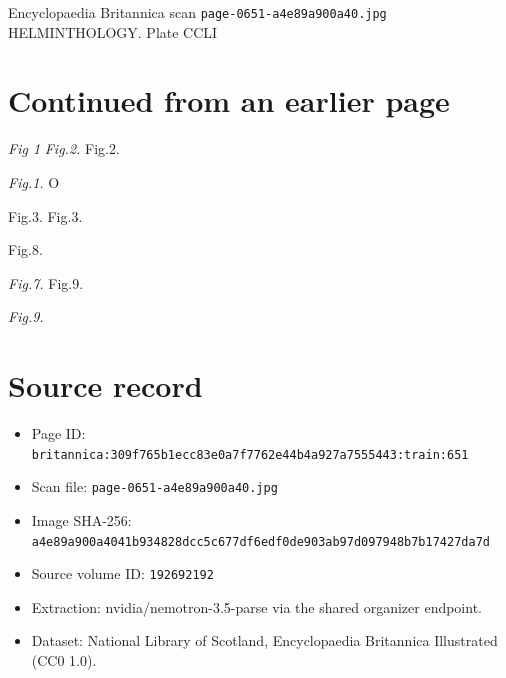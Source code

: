 \documentclass{article}
\begin{document}
\begin{center}
{\Large Encyclopaedia Britannica scan \texttt{page-0651-a4e89a900a40.jpg}}\\[0.5em]
HELMINTHOLOGY. Plate CCLI
\end{center}
\section*{Continued from an earlier page}
\textit{Fig 1}
\textit{Fig.2.}
Fig.2.

\textit{Fig.1.}
O

Fig.3. Fig.3.

Fig.8.

\textit{Fig.7.}
Fig.9.

\textit{Fig.9.}
\section*{Source record}
\begin{itemize}
\item Page ID: \texttt{britannica:309f765b1ecc83e0a7f7762e44b4a927a7555443:train:651}
\item Scan file: \texttt{page-0651-a4e89a900a40.jpg}
\item Image SHA-256: \texttt{a4e89a900a4041b934828dcc5c677df6edf0de903ab97d097948b7b17427da7d}
\item Source volume ID: \texttt{192692192}
\item Extraction: nvidia/nemotron-3.5-parse via the shared organizer endpoint.
\item Dataset: National Library of Scotland, Encyclopaedia Britannica Illustrated (CC0 1.0).
\end{itemize}
\end{document}
